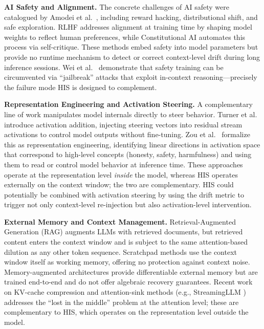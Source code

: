 \documentclass[a4paper,11pt]{article}
\begin{document}
\textbf{AI Safety and Alignment.}
The concrete challenges of AI safety were catalogued by Amodei et al.\ \cite{amodei2016}, including reward hacking, distributional shift, and safe exploration. RLHF \cite{ouyang2022} addresses alignment at training time by shaping model weights to reflect human preferences, while Constitutional AI \cite{bai2022} automates this process via self-critique. These methods embed safety into model parameters but provide no runtime mechanism to detect or correct context-level drift during long inference sessions. Wei et al.\ \cite{wei2023} demonstrate that safety training can be circumvented via ``jailbreak'' attacks that exploit in-context reasoning---precisely the failure mode HIS is designed to complement.

\textbf{Representation Engineering and Activation Steering.}
A complementary line of work manipulates model internals directly to steer behavior. Turner et al.\ \cite{turner2023} introduce activation addition, injecting steering vectors into residual stream activations to control model outputs without fine-tuning. Zou et al.\ \cite{zou2023repeng} formalize this as representation engineering, identifying linear directions in activation space that correspond to high-level concepts (honesty, safety, harmfulness) and using them to read or control model behavior at inference time. These approaches operate at the representation level \textit{inside} the model, whereas HIS operates externally on the context window; the two are complementary. HIS could potentially be combined with activation steering by using the drift metric to trigger not only context-level re-injection but also activation-level intervention.

\textbf{External Memory and Context Management.}
Retrieval-Augmented Generation (RAG) \cite{lewis2020} augments LLMs with retrieved documents, but retrieved content enters the context window and is subject to the same attention-based dilution as any other token sequence. Scratchpad methods \cite{nye2021, wei2022cot} use the context window itself as working memory, offering no protection against context noise. Memory-augmented architectures \cite{graves2014, wu2022} provide differentiable external memory but are trained end-to-end and do not offer algebraic recovery guarantees. Recent work on KV-cache compression and attention-sink methods (e.g., StreamingLLM \cite{xiao2024}) addresses the ``lost in the middle'' problem at the attention level; these are complementary to HIS, which operates on the representation level outside the model.
\end{document}
